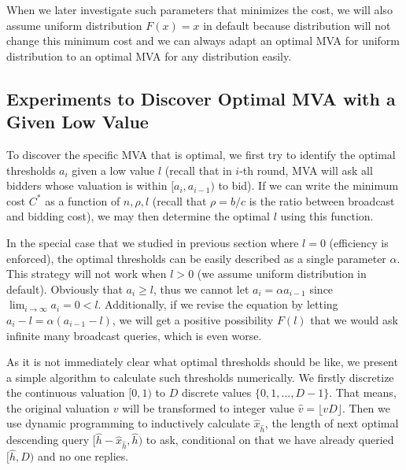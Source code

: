 When we later investigate such parameters that minimizes the cost, we will
also assume uniform distribution $F(x) = x$ in default because distribution will not
change this minimum cost and we can always adapt an optimal MVA for uniform distribution
to an optimal MVA for any distribution easily.

\subsection{Experiments to Discover Optimal MVA with a Given Low Value}

To discover the specific MVA that is optimal, we first try to identify the
optimal thresholds $a_i$ given a low value $l$  (recall that in $i$-th round,
MVA will ask all bidders whose valuation is within $[a_i, a_{i-1})$ to bid).
If we can write the minimum cost $C^*$ as a function of $n, \rho, l$ (recall
that $\rho = b/c$ is the ratio between broadcast and bidding cost), we may then
determine the optimal $l$ using this function.

In the special case that we studied in previous section where $l = 0$
(efficiency is enforced), the optimal thresholds can be easily described as a
single parameter $\alpha$. This strategy will not work when $l > 0$ (we assume uniform
distribution in default). Obviously that $a_i \geq l$,
thus we cannot let $a_i = \alpha a_{i-1}$ since $\lim_{i \rightarrow \infty} a_i
= 0 < l$.  Additionally, if we revise the equation by letting $a_i-l = \alpha
(a_{i-1}-l)$, we will get a positive possibility $F(l)$ that we would ask
infinite many broadcast queries, which is even worse.

As it is not immediately clear what optimal thresholds should be like, we
present a simple algorithm to calculate such thresholds numerically. We firstly
discretize the continuous valuation $[0, 1)$ to $D$ discrete values $\{0, 1, \ldots,
D-1\}$. That means, the original valuation $v$ will be transformed to integer
value $\hat v = \lfloor v D \rfloor$. Then we use dynamic programming to
inductively calculate $\hat x_{\hat h}$, the length of next optimal descending
query $[\hat h-\hat x_{\hat h}, \hat h)$ to ask, conditional on that we have
already queried $[\hat h, D)$ and no one replies.


